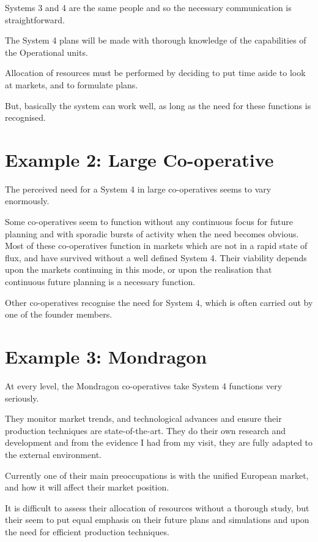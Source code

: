 Systems 3 and 4 are the same people and so the necessary communication is straightforward.

The System 4 plans will be made with thorough knowledge of the capabilities of the Operational units.

Allocation of resources must be performed by deciding to put time aside to look at markets, and to formulate plans.

But, basically the system can work well, as long as the need for these functions is recognised.

\section*{Example 2: Large Co-operative}
The perceived need for a System 4 in large co-operatives seems to vary enormously.

Some co-operatives seem to function without any continuous focus for future planning and with sporadic bursts of activity when the need becomes obvious. Most of these co-operatives function in markets which are not in a rapid state of flux, and have survived without a well defined System 4. Their viability depends upon the markets continuing in this mode, or upon the realisation that continuous future planning is a necessary function.

Other co-operatives recognise the need for System 4, which is often carried out by one of the founder members.

\section*{Example 3: Mondragon}
At every level, the Mondragon co-operatives take System 4 functions very seriously.

They monitor market trends, and technological advances and ensure their production techniques are state-of-the-art. They do their own research and development and from the evidence I had from my visit, they are fully adapted to the external environment.

Currently one of their main preoccupations is with the unified European market, and how it will affect their market position.

It is difficult to assess their allocation of resources without a thorough study, but their seem to put equal emphasis on their future plans and simulations and upon the need for efficient production techniques.
